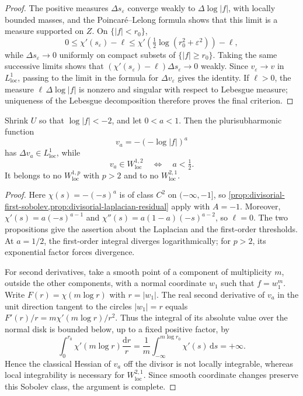 \begin{proof}
The positive measures $\Delta s_\varepsilon$ converge weakly to $\Delta\log|f|$, with locally bounded masses, and the Poincar\'e--Lelong formula shows that this limit is a measure supported on $Z$. On $\{|f|<r_0\}$,
\[
 0\leq\chi'(s_\varepsilon)-\ell
 \leq\chi'(\tfrac12\log(r_0^2+\varepsilon^2))-\ell,
\]
while $\Delta s_\varepsilon\to0$ uniformly on compact subsets of $\{|f|\geq r_0\}$. Taking the same successive limits shows that
$(\chi'(s_\varepsilon)-\ell)\Delta s_\varepsilon\to0$ weakly. Since $v_\varepsilon\to v$ in $L^1_{\mathrm{loc}}$, passing to the limit in the formula for $\Delta v_\varepsilon$ gives the identity. If $\ell>0$, the measure $\ell\,\Delta\log|f|$ is nonzero and singular with respect to Lebesgue measure; uniqueness of the Lebesgue decomposition therefore proves the final criterion.
\end{proof}

\begin{example}\label{ex:divisorial-sobolev-endpoint}
Shrink $U$ so that $\log|f|<-2$, and let $0<a<1$. Then the plurisubharmonic function
\[
 v_a=-(-\log|f|)^a
\]
has $\Delta v_a\in L^1_{\mathrm{loc}}$, while
\[
 v_a\in W^{1,2}_{\mathrm{loc}}
       \quad\Longleftrightarrow\quad a<\tfrac12.
\]
It belongs to no $W^{1,p}_{\mathrm{loc}}$ with $p>2$ and to no $W^{2,1}_{\mathrm{loc}}$.
\end{example}
\begin{proof}
Here $\chi(s)=-(-s)^a$ is of class $C^2$ on $(-\infty,-1]$, so \cref{prop:divisorial-first-sobolev,prop:divisorial-laplacian-residual} apply with $A=-1$. Moreover, $\chi'(s)=a(-s)^{a-1}$ and $\chi''(s)=a(1-a)(-s)^{a-2}$, so $\ell=0$. The two propositions give the assertion about the Laplacian and the first-order thresholds. At $a=1/2$, the first-order integral diverges logarithmically; for $p>2$, its exponential factor forces divergence.

For second derivatives, take a smooth point of a component of multiplicity $m$, outside the other components, with a normal coordinate $w_1$ such that $f=w_1^m$. Write $F(r)=\chi(m\log r)$ with $r=|w_1|$. The real second derivative of $v_a$ in the unit direction tangent to the circles $|w_1|=r$ equals $F'(r)/r=m\chi'(m\log r)/r^2$. Thus the integral of its absolute value over the normal disk is bounded below, up to a fixed positive factor, by
\[
 \int_0^{r_0}\chi'(m\log r)\frac{\mathrm dr}{r}
 =\frac1m\int_{-\infty}^{m\log r_0}\chi'(s)\,\mathrm ds
 =+\infty.
\]
Hence the classical Hessian of $v_a$ off the divisor is not locally integrable, whereas local integrability is necessary for $W^{2,1}_{\mathrm{loc}}$. Since smooth coordinate changes preserve this Sobolev class, the argument is complete.
\end{proof}

